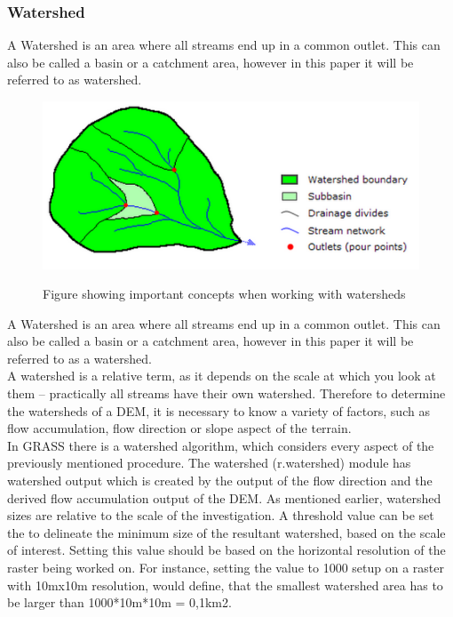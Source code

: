 \subsubsection{Watershed}
A Watershed is an area where all streams end up in a common outlet. This can also be called a basin or a catchment area, however in this paper it will be referred to as watershed.

\begin{figure}[b]
\centering
	{\includegraphics[width=\linewidth]{gfx/Watershed.png}}
\caption{Figure showing important concepts when working with watersheds}
\end{figure}

A Watershed is an area where all streams end up in a common outlet. This can also be called a basin or a catchment area, however in this paper it will be referred to as a watershed.\\

A watershed is a relative term, as it depends on the scale at which you look at them – practically all streams have their own watershed. Therefore to determine the watersheds of a DEM, it is necessary to know a variety of factors, such as flow accumulation, flow direction or slope aspect of the terrain. \\
In  GRASS there is a watershed algorithm, which considers every aspect of the previously mentioned procedure. The watershed (r.watershed) module has watershed output which is created by the output of the flow direction and the derived flow accumulation output of the DEM. As mentioned earlier, watershed sizes are relative to the scale of the investigation. A threshold value can be set the to delineate the minimum size of the resultant watershed, based on the scale of interest. Setting this value should be based on the horizontal resolution of the raster being worked on. For instance, setting the value to 1000 setup on a raster with 10mx10m resolution, would define, that the smallest watershed area has to be larger than 1000*10m*10m = 0,1km2.

